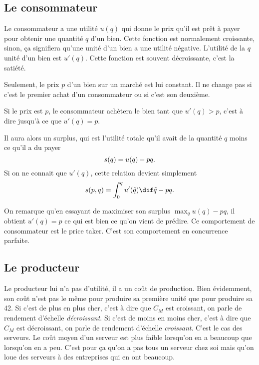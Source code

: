 \subsection{Le consommateur}
Le consommateur a une utilité $u(q)$ qui donne le prix qu'il est prêt à payer
pour obtenir une quantité $q$ d'un bien.
Cette fonction est normalement croissante, sinon, ça signifiera qu'une unité
d'un bien a une utilité négative.
L'utilité de la $q$\ieme{} unité d'un bien est $u'(q)$.
Cette fonction est souvent décroissante, c'est la satiété.

Seulement, le prix $p$ d'un bien sur un marché est lui constant.
Il ne change pas si c'est le premier achat d'un consommateur ou si
c'est son deuxième.

Si le prix est $p$, le consommateur achètera le bien tant que
$u'(q) > p$, c'est à dire jusqu'à ce que $u'(q) = p$.

Il aura alors un surplus, qui est l'utilité totale qu'il avait
de la quantité $q$ moins ce qu'il a du payer
\[ s(q) = u(q) - pq. \]
Si on ne connait que $u'(q)$, cette relation devient simplement
\begin{equation}
  \label{eq:surplus_1cons}
  \surplus(p, q) = \int_0^q u'(\tilde{q})\dif \tilde{q} - pq.
\end{equation}

On remarque qu'en essayant de maximiser son surplus $\max_q u(q) - pq$,
il obtient $u'(q) = p$ ce qui est bien ce qu'on vient de prédire.
Ce comportement de consommateur est le price taker.
C'est son comportement en concurrence parfaite.

\subsection{Le producteur}
Le producteur lui n'a pas d'utilité, il a un coût de production.
Bien évidemment, son coût n'est pas le même pour produire sa première unité
que pour produire sa 42\ieme{}.
Si c'est de plus en plus cher,
c'est à dire que $C_M$ est croissant,
on parle de rendement d'échelle \emph{décroissant}.
Si c'est de moins en moins cher,
c'est à dire que $C_M$ est décroissant,
on parle de rendement d'échelle \emph{croissant}.
C'est le cas des serveurs.
Le coût moyen d'un serveur est plus faible lorsqu'on en a beaucoup que
lorsqu'on en a peu.
C'est pour ça qu'on a pas tous un serveur chez soi mais qu'on loue
des serveurs à des entreprises qui en ont beaucoup.

